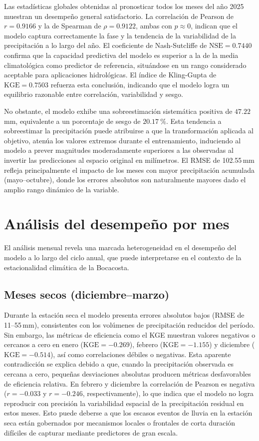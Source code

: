 Las estadísticas globales obtenidas al pronosticar todos los meses del año 2025 muestran
un desempeño general satisfactorio. La correlación de Pearson de $r = 0.9166$ y la de
Spearman de $\rho = 0.9122$, ambas con $p \approx 0$, indican que el modelo captura
correctamente la fase y la tendencia de la variabilidad de la precipitación a lo largo
del año. El coeficiente de Nash-Sutcliffe de $\text{NSE} = 0.7440$ confirma que la
capacidad predictiva del modelo es superior a la de la media
climatológica como predictor de referencia, situándose en un rango considerado aceptable
para aplicaciones hidrológicas. El índice de Kling-Gupta de
$\text{KGE} = 0.7503$ refuerza esta conclusión, indicando que el modelo logra un
equilibrio razonable entre correlación, variabilidad y sesgo.

No obstante, el modelo exhibe una sobreestimación sistemática positiva de
$47.22$ mm, equivalente a un porcentaje de sesgo de
$20.17\ \%$. Esta tendencia a sobreestimar la precipitación puede atribuirse a que la transformación 
aplicada al objetivo, atenúa los valores extremos durante el entrenamiento,
induciendo al modelo a prever magnitudes moderadamente superiores a las observadas al
invertir las predicciones al espacio original en milímetros. El RMSE de 102.55\,mm
refleja principalmente el impacto de los meses con mayor precipitación acumulada
(mayo--octubre), donde los errores absolutos son naturalmente mayores dado el amplio
rango dinámico de la variable.

\section{Análisis del desempeño por mes}

El análisis mensual revela una marcada heterogeneidad en el desempeño del modelo a
lo largo del ciclo anual, que puede interpretarse en el contexto de la estacionalidad
climática de la Bocacosta.

\subsection*{Meses secos (diciembre--marzo)}

Durante la estación seca el modelo presenta errores absolutos bajos
(RMSE de 11--55\,mm), consistentes con los volúmenes de precipitación reducidos del
período. Sin embargo, las métricas de eficiencia como el KGE muestran valores negativos
o cercanos a cero en enero ($\text{KGE} = -0.269$), febrero ($\text{KGE} = -1.155$)
y diciembre ($\text{KGE} = -0.514$), así como correlaciones débiles o negativas. Esta
aparente contradicción se explica debido a que, cuando la precipitación observada es cercana a
cero, pequeñas desviaciones absolutas producen métricas desfavorables 
de eficiencia relativa. En febrero y diciembre la correlación de Pearson es negativa
($r = -0.033$ y $r = -0.246$, respectivamente), lo que indica que el modelo no logra
reproducir con precisión la variabilidad espacial de la precipitación residual en estos meses. Esto
puede deberse a que los escasos eventos de lluvia en la estación seca están gobernados
por mecanismos locales o frontales de corta duración difíciles de capturar mediante
predictores de gran escala.

